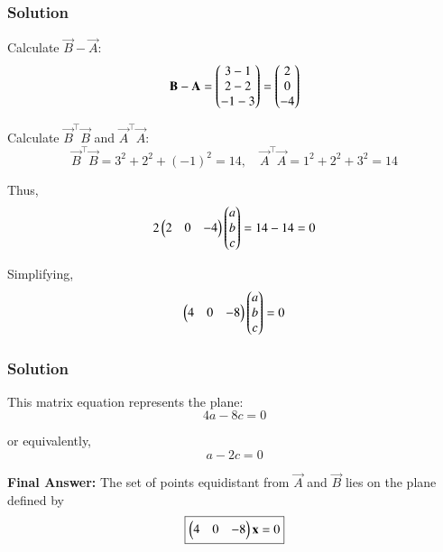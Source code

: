 \documentclass{beamer}
\numberwithin{equation}{section}
\begin{document}
\begin{frame}[fragile]
    \frametitle{Solution}
Calculate \(\vec{B} - \vec{A}\):
\begin{equation}
\mathbf{B} - \mathbf{A} = \begin{pmatrix}3 - 1 \\ 2 - 2 \\ -1 - 3\end{pmatrix} = \begin{pmatrix}2 \\ 0 \\ -4\end{pmatrix}
\end{equation}

Calculate \(\vec{B}^\top \vec{B}\) and \(\vec{A}^\top \vec{A}\):
\begin{equation}
\vec{B}^\top \vec{B} = 3^2 + 2^2 + (-1)^2 = 14, \quad
\vec{A}^\top \vec{A} = 1^2 + 2^2 + 3^2 = 14
\end{equation}

Thus,
\begin{equation}
2 \begin{pmatrix}2 & 0 & -4\end{pmatrix} \begin{pmatrix}a \\ b \\ c\end{pmatrix} = 14 - 14 = 0
\end{equation}

Simplifying,
\begin{equation}
\begin{pmatrix}4 & 0 & -8\end{pmatrix} \begin{pmatrix}a \\ b \\ c\end{pmatrix} = 0
\end{equation}

\end{frame}
\begin{frame}[fragile]
    \frametitle{Solution}


This matrix equation represents the plane:
\begin{equation}
4a - 8c = 0
\end{equation}

or equivalently,
\begin{equation}
a - 2c = 0
\end{equation}

\textbf{Final Answer:} The set of points equidistant from \(\vec{A}\) and \(\vec{B}\) lies on the plane defined by
\[
\boxed{
\begin{pmatrix}4 & 0 & -8\end{pmatrix} \mathbf{x} = 0
}
\]


\end{frame}
\end{document}
